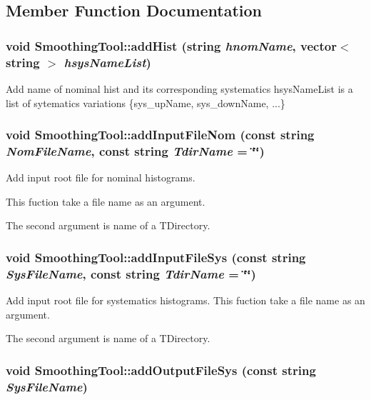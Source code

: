 \subsection{Member Function Documentation}
\hypertarget{classSmoothingTool_a044eda85524db01f38851c5a0c7e863f}{
\subsubsection[{addHist}]{\setlength{\rightskip}{0pt plus 5cm}void SmoothingTool::addHist (string {\em hnomName}, \/  vector$<$ string $>$ {\em hsysNameList})}}
\label{classSmoothingTool_a044eda85524db01f38851c5a0c7e863f}
Add name of nominal hist and its corresponding systematics hsysNameList is a list of sytematics variations \{sys\_\-upName, sys\_\-downName, ...\} \hypertarget{classSmoothingTool_ab4ed389aff32080bc9849abb237cc58c}{
\subsubsection[{addInputFileNom}]{\setlength{\rightskip}{0pt plus 5cm}void SmoothingTool::addInputFileNom (const string {\em NomFileName}, \/  const string {\em TdirName} = {\ttfamily \char`\"{}\char`\"{}})}}
\label{classSmoothingTool_ab4ed389aff32080bc9849abb237cc58c}
Add input root file for nominal histograms.\par
 This fuction take a file name as an argument.\par
 The second argument is name of a TDirectory. \hypertarget{classSmoothingTool_acd749c135533838fa53bffc961241a90}{
\subsubsection[{addInputFileSys}]{\setlength{\rightskip}{0pt plus 5cm}void SmoothingTool::addInputFileSys (const string {\em SysFileName}, \/  const string {\em TdirName} = {\ttfamily \char`\"{}\char`\"{}})}}
\label{classSmoothingTool_acd749c135533838fa53bffc961241a90}
Add input root file for systematics histograms. This fuction take a file name as an argument.\par
 The second argument is name of a TDirectory. \hypertarget{classSmoothingTool_acebcdc9de5c01a9e5a4fae7253f4fa7b}{
\subsubsection[{addOutputFileSys}]{\setlength{\rightskip}{0pt plus 5cm}void SmoothingTool::addOutputFileSys (const string {\em SysFileName})}}
